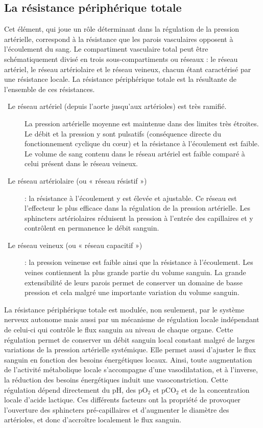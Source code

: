 \documentclass[a4paper,12pt,twoside]{report}
\begin{document}
\subsection{La résistance périphérique totale}

Cet élément, qui joue un rôle déterminant dans la régulation de la pression artérielle, correspond à la résistance que les parois vasculaires opposent à l’écoulement du sang. Le compartiment vasculaire total peut être schématiquement divisé en trois sous-compartiments ou réseaux : le réseau artériel, le réseau artériolaire et le réseau veineux, chacun étant caractérisé par une résistance locale. La résistance périphérique totale est la résultante de l’ensemble de ces résistances.

\begin{description}
\item [\textbullet~Le réseau artériel (depuis l’aorte jusqu’aux artérioles) est très ramifié.] La pression artérielle moyenne est maintenue dans des limites très étroites. Le débit et la pression y sont pulsatifs (conséquence directe du fonctionnement cyclique du cœur) et la résistance à l’écoulement est faible. Le volume de sang contenu dans le réseau artériel est faible comparé à celui présent dans le réseau veineux.
\item [\textbullet~Le réseau artériolaire (ou « réseau résistif »)] : la résistance à l’écoulement y est élevée et ajustable. Ce réseau est l’effecteur le plus efficace dans la régulation de la pression artérielle. Les sphincters artériolaires réduisent la pression à l’entrée des capillaires et y contrôlent en permanence le débit sanguin. 
\item [\textbullet~Le réseau veineux (ou « réseau capacitif »)] : la pression veineuse est faible ainsi que la résistance à l’écoulement. Les veines contiennent la plus grande partie du volume sanguin. La grande extensibilité de leurs parois permet de conserver un domaine de basse pression et cela malgré une importante variation du volume sanguin.
\end{description}

La résistance périphérique totale est modulée, non seulement, par le système nerveux autonome mais aussi par un mécanisme de régulation locale indépendant de celui-ci qui contrôle le flux sanguin au niveau de chaque organe. Cette régulation permet de conserver un débit sanguin local constant malgré de larges variations de la pression artérielle systémique. Elle permet aussi d’ajuster le flux sanguin en fonction des besoins énergétiques locaux. Ainsi, toute augmentation de l’activité métabolique locale s’accompagne d’une vasodilatation, et à l’inverse, la réduction des besoins énergétiques induit une vasoconstriction. Cette régulation dépend directement du pH, des pO$_{2}$ et pCO$_{2}$ et de la concentration locale d’acide lactique. Ces différents facteurs ont la propriété de provoquer l’ouverture des sphincters pré-capillaires et d’augmenter le diamètre des artérioles, et donc d’accroître localement le flux sanguin.
\end{document}

